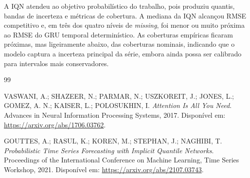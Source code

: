 \documentclass[a4paper,11pt]{article}
\begin{document}
A IQN atendeu ao objetivo probabilístico do trabalho, pois produziu quantis,
bandas de incerteza e métricas de cobertura. A mediana da IQN alcançou RMSE
competitivo e, em três dos quatro níveis de \textit{missing}, foi menor ou muito
próxima ao RMSE do GRU temporal determinístico. As coberturas empíricas ficaram
próximas, mas ligeiramente abaixo, das coberturas nominais, indicando que o
modelo captura a incerteza principal da série, embora ainda possa ser calibrado
para intervalos mais conservadores.

{\footnotesize
\begin{thebibliography}{99}

VASWANI, A.; SHAZEER, N.; PARMAR, N.; USZKOREIT, J.; JONES, L.; GOMEZ, A. N.;
KAISER, L.; POLOSUKHIN, I. \textit{Attention Is All You Need}. Advances in
Neural Information Processing Systems, 2017. Disponível em:
\url{https://arxiv.org/abs/1706.03762}.

GOUTTES, A.; RASUL, K.; KOREN, M.; STEPHAN, J.; NAGHIBI, T.
\textit{Probabilistic Time Series Forecasting with Implicit Quantile Networks}.
Proceedings of the International Conference on Machine Learning, Time Series
Workshop, 2021. Disponível em: \url{https://arxiv.org/abs/2107.03743}.

\end{thebibliography}
}
\end{document}
